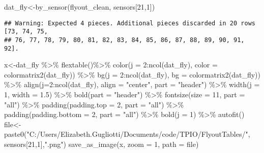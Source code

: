 \documentclass[
]{article}
\newenvironment{Shaded}{\begin{snugshade}}{\end{snugshade}}
\newcommand{\AttributeTok}[1]{\textcolor[rgb]{0.77,0.63,0.00}{#1}}
\newcommand{\DecValTok}[1]{\textcolor[rgb]{0.00,0.00,0.81}{#1}}
\newcommand{\FloatTok}[1]{\textcolor[rgb]{0.00,0.00,0.81}{#1}}
\newcommand{\FunctionTok}[1]{\textcolor[rgb]{0.00,0.00,0.00}{#1}}
\newcommand{\NormalTok}[1]{#1}
\newcommand{\OtherTok}[1]{\textcolor[rgb]{0.56,0.35,0.01}{#1}}
\newcommand{\SpecialCharTok}[1]{\textcolor[rgb]{0.00,0.00,0.00}{#1}}
\newcommand{\StringTok}[1]{\textcolor[rgb]{0.31,0.60,0.02}{#1}}
\begin{document}
\begin{Shaded}
\begin{Highlighting}[]
\NormalTok{dat\_fly}\OtherTok{\textless{}{-}}\FunctionTok{by\_sensor}\NormalTok{(flyout\_clean, sensors[}\DecValTok{21}\NormalTok{,}\DecValTok{1}\NormalTok{])}
\end{Highlighting}
\end{Shaded}

\begin{verbatim}
## Warning: Expected 4 pieces. Additional pieces discarded in 20 rows [73, 74, 75,
## 76, 77, 78, 79, 80, 81, 82, 83, 84, 85, 86, 87, 88, 89, 90, 91, 92].
\end{verbatim}

\begin{Shaded}
\begin{Highlighting}[]
\NormalTok{x}\OtherTok{\textless{}{-}}\NormalTok{dat\_fly }\SpecialCharTok{\%\textgreater{}\%}
    \FunctionTok{flextable}\NormalTok{()}\SpecialCharTok{\%\textgreater{}\%}
    \FunctionTok{color}\NormalTok{(}\AttributeTok{j =} \DecValTok{2}\SpecialCharTok{:}\FunctionTok{ncol}\NormalTok{(dat\_fly), }\AttributeTok{color =} \FunctionTok{colormatrix2}\NormalTok{(dat\_fly)) }\SpecialCharTok{\%\textgreater{}\%}
    \FunctionTok{bg}\NormalTok{(}\AttributeTok{j =} \DecValTok{2}\SpecialCharTok{:}\FunctionTok{ncol}\NormalTok{(dat\_fly), }\AttributeTok{bg =} \FunctionTok{colormatrix2}\NormalTok{(dat\_fly)) }\SpecialCharTok{\%\textgreater{}\%}
    \FunctionTok{align}\NormalTok{(}\AttributeTok{j=}\DecValTok{2}\SpecialCharTok{:}\FunctionTok{ncol}\NormalTok{(dat\_fly), }\AttributeTok{align =} \StringTok{"center"}\NormalTok{, }\AttributeTok{part =} \StringTok{"header"}\NormalTok{) }\SpecialCharTok{\%\textgreater{}\%}
    \FunctionTok{width}\NormalTok{(}\AttributeTok{j =} \DecValTok{1}\NormalTok{, }\AttributeTok{width =} \FloatTok{1.5}\NormalTok{) }\SpecialCharTok{\%\textgreater{}\%}
    \FunctionTok{bold}\NormalTok{(}\AttributeTok{part =} \StringTok{"header"}\NormalTok{) }\SpecialCharTok{\%\textgreater{}\%}
    \FunctionTok{fontsize}\NormalTok{(}\AttributeTok{size =} \DecValTok{11}\NormalTok{, }\AttributeTok{part =} \StringTok{"all"}\NormalTok{) }\SpecialCharTok{\%\textgreater{}\%}
    \FunctionTok{padding}\NormalTok{(}\AttributeTok{padding.top =} \DecValTok{2}\NormalTok{, }\AttributeTok{part =} \StringTok{"all"}\NormalTok{) }\SpecialCharTok{\%\textgreater{}\%}
    \FunctionTok{padding}\NormalTok{(}\AttributeTok{padding.bottom =} \DecValTok{2}\NormalTok{, }\AttributeTok{part =} \StringTok{"all"}\NormalTok{) }\SpecialCharTok{\%\textgreater{}\%}
    \FunctionTok{bold}\NormalTok{(}\AttributeTok{j =} \DecValTok{1}\NormalTok{) }\SpecialCharTok{\%\textgreater{}\%} \FunctionTok{autofit}\NormalTok{()}
\NormalTok{file}\OtherTok{\textless{}{-}}\FunctionTok{paste0}\NormalTok{(}\StringTok{"C:/Users/Elizabeth.Gugliotti/Documents/code/TPIO/FlyoutTables/"}\NormalTok{, sensors[}\DecValTok{21}\NormalTok{,}\DecValTok{1}\NormalTok{],}\StringTok{".png"}\NormalTok{)}
\FunctionTok{save\_as\_image}\NormalTok{(x, }\AttributeTok{zoom =} \DecValTok{1}\NormalTok{, }\AttributeTok{path =}\NormalTok{ file)}
\end{Highlighting}
\end{Shaded}
\end{document}
